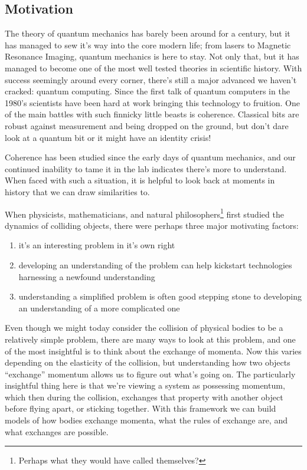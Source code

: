 \documentclass[11pt,english]{article}
\theoremstyle{definition}
\begin{document}
\subsection{Motivation}

The theory of quantum mechanics has barely been around for a century, but it has managed to sew it's way into the core modern life; from lasers to Magnetic Resonance Imaging, quantum mechanics is here to stay. Not only that, but it has managed to become one of the most well tested theories in scientific history. With success seemingly around every corner, there's still a major advanced we haven't cracked: quantum computing. Since the first talk of quantum computers in the 1980's scientists have been hard at work bringing this technology to fruition. One of the main battles with such finnicky little beasts is coherence. Classical bits are robust against measurement and being dropped on the ground, but don't dare look at a quantum bit or it might have an identity crisis!

Coherence has been studied since the early days of quantum mechanics, and our continued inability to tame it in the lab indicates there's more to understand. When faced with such a situation, it is helpful to look back at moments in history that we can draw similarities to.

When physicists, mathematicians, and natural philosophers\footnote{Perhaps what they would have called themselves?} first studied the dynamics of colliding objects, there were perhaps three major motivating factors:
\begin{enumerate}
	\item it's an interesting problem in it's own right
	\item developing an understanding of the problem can help kickstart technologies harnessing a newfound understanding
	\item understanding a simplified problem is often good stepping stone to developing an understanding of a more complicated one
\end{enumerate}
Even though we might today consider the collision of physical bodies to be a relatively simple problem, there are many ways to look at this problem, and one of the most insightful is to think about the exchange of momenta. Now this varies depending on the elasticity of the collision, but understanding how two objects ``exchange'' momentum allows us to figure out what's going on. The particularly insightful thing here is that we're viewing a system as possessing momentum, which then during the collision, exchanges that property with another object before flying apart, or sticking together. With this framework we can build models of how bodies exchange momenta, what the rules of exchange are, and what exchanges are possible.
\end{document}
